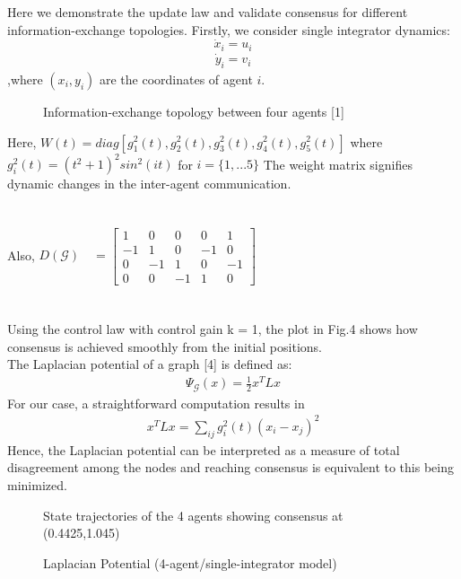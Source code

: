 \documentclass[journal]{IEEEtran}
\begin{document}
Here we demonstrate the update law and validate consensus for different information-exchange topologies. Firstly, we consider single integrator dynamics: $$\dot{x}_i = u_i$$\begin{align}\dot{y}_i = v_i\end{align},where $(x_i,y_i)$ are the coordinates of agent $i$. 
\begin{figure}[h]
\caption{Information-exchange topology between four agents [1]}
\end{figure}
Here, $W(t) = diag[g_1^2(t),g_2^2(t),g_3^2(t),g_4^2(t),g_5^2(t)]$ where $g_i^2(t) = (t^2+1)^2sin^2(it)$ for $i = \{1,...5\}$ The weight matrix signifies dynamic changes in the inter-agent communication. \\\\\\
Also, $ D(\mathcal{G})\quad = \begin{bmatrix}
1&0&0&0&1\\-1&1&0&-1&0\\0&-1&1&0&-1\\0&0&-1&1&0
\end{bmatrix}$ \\\\\\
Using the control law with control gain k = 1, the plot in Fig.4 shows how consensus is achieved smoothly from the initial positions. \\ The Laplacian potential of a graph [4] is defined as:\begin{align} \Psi_\mathcal{G}(x) = \frac{1}{2}x^TLx\end{align}
For our case, a straightforward computation  results in \begin{align}x^TLx = \sum_{ij} g_i^2(t)(x_i-x_j)^2 \end{align}
Hence, the Laplacian potential can be interpreted as a measure of total disagreement among the nodes and reaching consensus is equivalent to this being minimized.  
\begin{figure}[h]
\caption{State trajectories of the 4 agents showing consensus at (0.4425,1.045)}
\end{figure}
\begin{figure}[h]
\caption{Laplacian Potential (4-agent/single-integrator model)}
\end{figure}
\\\\
\end{document}
